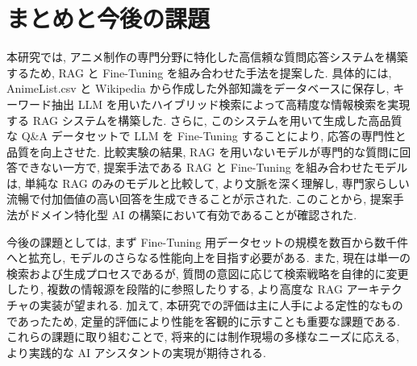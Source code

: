 \documentclass{jarticle}
\begin{document}
\vspace{-3mm}
\section{まとめと今後の課題}
\vspace{-1mm}

本研究では, アニメ制作の専門分野に特化した高信頼な質問応答システムを構築するため, RAG と Fine-Tuning を組み合わせた手法を提案した. 具体的には, AnimeList.csv と Wikipedia から作成した外部知識をデータベースに保存し, キーワード抽出 LLM を用いたハイブリッド検索によって高精度な情報検索を実現する RAG システムを構築した. さらに, このシステムを用いて生成した高品質な Q\&A データセットで LLM を Fine-Tuning することにより, 応答の専門性と品質を向上させた. 比較実験の結果, RAG を用いないモデルが専門的な質問に回答できない一方で, 提案手法である RAG と Fine-Tuning を組み合わせたモデルは, 単純な RAG のみのモデルと比較して, より文脈を深く理解し, 専門家らしい流暢で付加価値の高い回答を生成できることが示された. このことから, 提案手法がドメイン特化型 AI の構築において有効であることが確認された. \par

今後の課題としては, まず Fine-Tuning 用データセットの規模を数百から数千件へと拡充し, モデルのさらなる性能向上を目指す必要がある. また, 現在は単一の検索および生成プロセスであるが, 質問の意図に応じて検索戦略を自律的に変更したり, 複数の情報源を段階的に参照したりする, より高度な RAG アーキテクチャの実装が望まれる. 加えて, 本研究での評価は主に人手による定性的なものであったため, 定量的評価により性能を客観的に示すことも重要な課題である. これらの課題に取り組むことで, 将来的には制作現場の多様なニーズに応える, より実践的な AI アシスタントの実現が期待される.

\vspace{-3mm}


\end{document}

